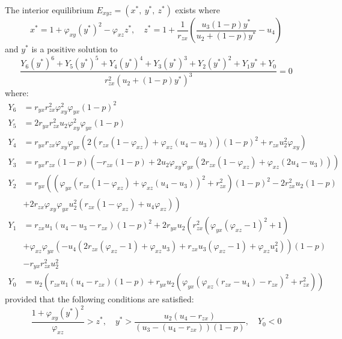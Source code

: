 \begin{theorem}\label{thm:interior-exist}
    The interior equilibrium $E_{xyz}=\left(x^*,\ y^*,\ z^*\right)$ exists where
    \begin{equation*}
        x^*=1+\varphi_{xy}\left(y^*\right)^2-\varphi_{xz}z^*,\quad 
        z^*=1+\frac{1}{r_{zx}}\left(\frac{u_3\left(1-p\right)y^*}{u_2+\left(1-p\right)y^*}-u_4\right)
    \end{equation*}
    and $y^*$ is a positive solution to 
    \begin{equation}\label{eq:interior-Y}
        \frac{Y_6\left(y^*\right)^6+Y_5\left(y^*\right)^5+Y_4\left(y^*\right)^4+Y_3\left(y^*\right)^3+Y_2\left(y^*\right)^2+Y_1y^*+Y_0}{r_{zx}^2\left(u_2+\left(1-p\right)y^*\right)^3}=0
    \end{equation}
    where:
    \begin{align*}
        Y_6 &= r_{yx}r_{zx}^2\varphi_{xy}^2\varphi_{yx}\left(1-p\right)^2\\
        Y_5 &= 2r_{yx}r_{zx}^2u_2\varphi_{xy}^2\varphi_{yx}\left(1-p\right)\\
        Y_4 &= r_{yx}r_{zx}\varphi_{xy}\varphi_{yx}\left(2\left(r_{zx}\left(1-\varphi_{xz}\right)+\varphi_{xz}\left(u_4-u_3\right)\right)\left(1-p\right)^2+r_{zx}u_2^2\varphi_{xy}\right)\\
        Y_3 &= r_{yx}r_{zx}\left(1-p\right)\left(-r_{zx}\left(1-p\right)+2u_2\varphi_{xy}\varphi_{yx}\left(2r_{zx}\left(1-\varphi_{xz}\right)+\varphi_{xz}\left(2u_4-u_3\right)\right)\right)\\
        Y_2 &= r_{yx}\left(\left(\varphi_{yx}\left(r_{zx}\left(1-\varphi_{xz}\right)+\varphi_{xz}\left(u_4-u_3\right)\right)^2+r_{zx}^2\right)\left(1-p\right)^2-2r_{zx}^2u_2\left(1-p\right)\right.\\
        &\left.+2r_{zx}\varphi_{xy}\varphi_{yx}u_2^2\left(r_{zx}\left(1-\varphi_{xz}\right)+u_4\varphi_{xz}\right)\right)\\
        Y_1 &= r_{zx}u_1\left(u_4-u_3-r_{zx}\right)\left(1-p\right)^2+2r_{yx}u_2\left(r_{zx}^2\left(\varphi_{yx}\left(\varphi_{xz}-1\right)^2+1\right)\right.\\
        &\left.+\varphi_{xz}\varphi_{yx}\left(-u_4\left(2r_{zx}\left(\varphi_{xz}-1\right)+\varphi_{xz}u_3\right)+r_{zx}u_3\left(\varphi_{xz}-1\right)+\varphi_{xz}u_4^2\right)\right)\left(1-p\right)\\
        &-r_{yx}r_{zx}^2u_2^2\\
        Y_0 &= u_2\left(r_{zx}u_1\left(u_4-r_{zx}\right)\left(1-p\right)+r_{yx}u_2\left(\varphi_{yx}\left(\varphi_{xz}\left(r_{zx}-u_4\right)-r_{zx}\right)^2+r_{zx}^2\right)\right)
    \end{align*}
    provided that the following conditions are satisfied:
    \begin{equation*}
        \frac{1+\varphi_{xy}\left(y^*\right)^2}{\varphi_{xz}}>z^*,\quad
        y^*>\frac{u_2\left(u_4-r_{zx}\right)}{\left(u_3-\left(u_4-r_{zx}\right)\right)\left(1-p\right)},\quad
        Y_0 < 0
    \end{equation*}
\end{theorem}
